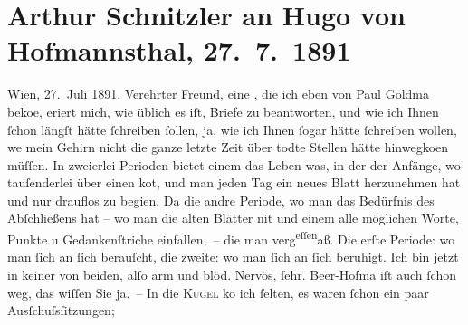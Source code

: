                \section[Arthur Schnitzler an Hugo von Hofmannsthal, 27. 7. 1891]{ Arthur Schnitzler an Hugo von Hofmannsthal, 27. 7. 1891}\nopagebreak{}\rehead{ }\begin{ledgroupsized}[t]{13cm}\normalsize\beginnumbering \toendnotes[C]{\smallbreak\pagebreak[2]} 
\toendnotes[C]{\smallbreak}\pstart
           \raggedleft{}{\pb}Wien, 27. Juli
                  1891.\pend
           \pstart
           Verehrter Freund, eine \label{K_L00025-3v}\label{K_L00025-3h}, die ich eben von Paul Goldma{\geminationn} beko{\geminationm}e, eri{\geminationn}ert mich,
               wie üblich es iſt, Briefe zu beantworten, und wie ich Ihnen ſchon längſt hätte
               ſchreiben ſollen, ja, wie ich Ihnen ſogar hätte ſchreiben wollen, we{\geminationn} mein Gehirn nicht die ganze letzte Zeit über todte
               Stellen hätte hinwegko{\geminationm}en müſſen. In zweierlei Perioden
               bietet einem das Leben was, in der der Anfänge, wo tauſenderlei über einen ko{\geminationm}t, und man {\pb}jeden Tag ein
               neues Blatt herzunehmen hat und nur drauflos zu begi{\geminationn}en.
                  Da{\geminationn} die andre Periode, wo man das Bedürfnis des
               Abſchließens hat – wo man die alten Blätter ni{\geminationm}t und
               einem alle möglichen Worte, Punkte u Gedankenſtriche einfallen, – die man verg\substVorne{}\textsuperscript{eſſen}\substDazwischen{}aß\substHinten{}{}. Die erſte Periode: wo man ſich an ſich
               berauſcht, die zweite: wo man ſich an ſich beruhigt. Ich bin jetzt in keiner von
               beiden, alſo arm und blöd. Nervös, ſehr. Beer-{\pb}Hofma{\geminationn} iſt auch ſchon weg, das wiſſen Sie ja. – In die \textsc{Kugel} ko{\geminationm} ich ſelten, es waren ſchon ein paar Ausſchuſsſitzungen;

\end{ledgroupsized}
